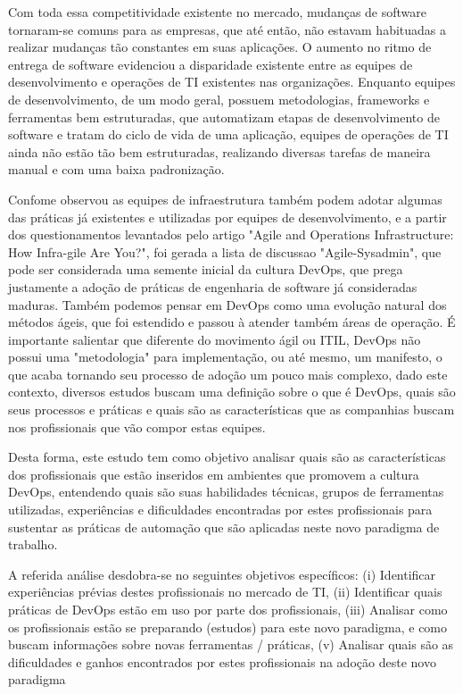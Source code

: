\documentclass[twoside,english,brazilian]{UNISINOSartigo}
\begin{document}
Com toda essa competitividade existente no mercado, mudanças de software tornaram-se comuns para as empresas, que até então, não estavam habituadas a realizar mudanças tão constantes em suas aplicações. O aumento no ritmo de entrega de software evidenciou a disparidade existente entre as equipes de desenvolvimento e operações de TI existentes nas organizações. Enquanto equipes de desenvolvimento, de um modo geral, possuem metodologias, frameworks e ferramentas bem estruturadas, que automatizam etapas de desenvolvimento de software e tratam do ciclo de vida de uma aplicação, equipes de operações de TI ainda  não estão tão bem estruturadas, realizando diversas tarefas de maneira manual e com uma baixa padronização. 

Confome  observou as equipes de infraestrutura também podem adotar algumas das práticas já existentes e utilizadas por equipes de desenvolvimento, e a partir dos questionamentos levantados pelo artigo "Agile and Operations Infrastructure: How Infra-gile Are You?", foi gerada a lista de discussao "Agile-Sysadmin", que pode ser considerada uma semente inicial da cultura DevOps, que prega justamente a adoção de práticas de engenharia de software já consideradas maduras. Também podemos pensar em DevOps como uma evolução natural dos métodos ágeis, que foi estendido e passou à atender também áreas de operação. É importante salientar que diferente do movimento ágil ou ITIL, DevOps não possui uma "metodologia" para implementação, ou até mesmo, um manifesto, o que acaba tornando seu processo de adoção um pouco mais complexo, dado este contexto, diversos estudos buscam uma definição sobre o que é DevOps, quais são seus processos e práticas e quais são as características que as companhias buscam nos profissionais que vão compor estas equipes.

Desta forma, este estudo tem como objetivo analisar quais são as características dos profissionais que estão inseridos em ambientes que promovem a cultura DevOps, entendendo quais são suas habilidades técnicas, grupos de ferramentas utilizadas, experiências e dificuldades encontradas por estes profissionais para sustentar as práticas de automação que são aplicadas neste novo paradigma de trabalho.

A referida análise desdobra-se no seguintes objetivos específicos: (i) Identificar experiências prévias destes profissionais no mercado de TI, (ii) Identificar quais práticas de DevOps estão em uso por parte dos profissionais, (iii) Analisar como os profissionais estão se preparando (estudos) para este novo paradigma, e como buscam informações sobre novas ferramentas / práticas, (v) Analisar quais são as dificuldades e ganhos encontrados por estes profissionais na adoção deste novo paradigma
\end{document}
